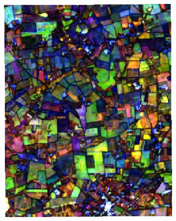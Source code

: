 \documentclass[journal,article,submit,pdftex,moreauthors]{Definitions/mdpi}
\providecommand{\DIFaddbeginFL}{} %
\providecommand{\DIFaddendFL}{} %
\providecommand{\DIFdelbeginFL}{} %
\providecommand{\DIFdelendFL}{} %
\begin{document}
\begin{figure}[H]
\begin{subfigure}[t]{0.23\linewidth}
\DIFdelendFL \DIFaddbeginFL \includegraphics[width=0.95\linewidth]{figures/aes_1_layer_mse_results/composites/composite_image_514283.pdf}
    \DIFaddendFL \caption{}
	\label{fig:color_map_g}
	\end{subfigure}
    \begin{subfigure}[t]{0.23\linewidth}
		\centering
	\DIFdelbeginFL %

\end{subfigure}
\end{figure}
\end{document}
